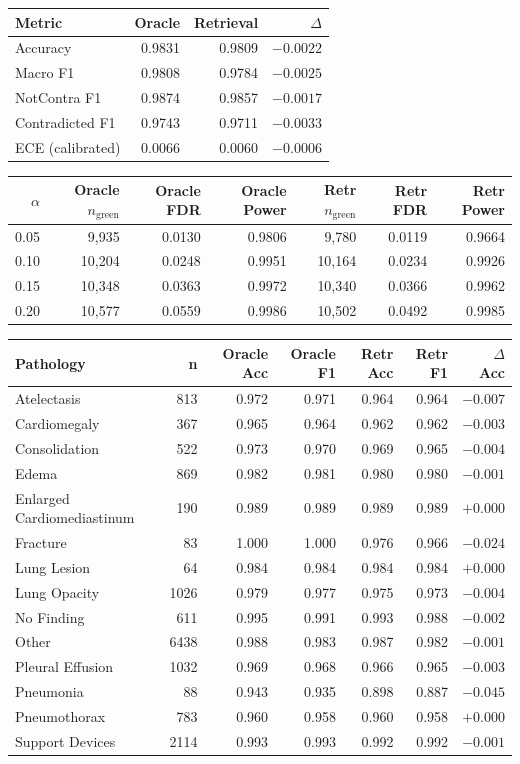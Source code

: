 \begin{tabular}{lrrr}
\toprule
Metric & Oracle & Retrieval & $\Delta$ \\
\midrule
Accuracy & 0.9831 & 0.9809 & $-0.0022$ \\
Macro F1 & 0.9808 & 0.9784 & $-0.0025$ \\
NotContra F1 & 0.9874 & 0.9857 & $-0.0017$ \\
Contradicted F1 & 0.9743 & 0.9711 & $-0.0033$ \\
ECE (calibrated) & 0.0066 & 0.0060 & $-0.0006$ \\
\bottomrule
\end{tabular}

\begin{tabular}{rrrrrrr}
\toprule
$\alpha$ & Oracle $n_\text{green}$ & Oracle FDR & Oracle Power & Retr $n_\text{green}$ & Retr FDR & Retr Power \\
\midrule
0.05 & 9,935 & 0.0130 & 0.9806 & 9,780 & 0.0119 & 0.9664 \\
0.10 & 10,204 & 0.0248 & 0.9951 & 10,164 & 0.0234 & 0.9926 \\
0.15 & 10,348 & 0.0363 & 0.9972 & 10,340 & 0.0366 & 0.9962 \\
0.20 & 10,577 & 0.0559 & 0.9986 & 10,502 & 0.0492 & 0.9985 \\
\bottomrule
\end{tabular}

\begin{tabular}{lrrrrrr}
\toprule
Pathology & n & Oracle Acc & Oracle F1 & Retr Acc & Retr F1 & $\Delta$ Acc \\
\midrule
Atelectasis & 813 & 0.972 & 0.971 & 0.964 & 0.964 & $-0.007$ \\
Cardiomegaly & 367 & 0.965 & 0.964 & 0.962 & 0.962 & $-0.003$ \\
Consolidation & 522 & 0.973 & 0.970 & 0.969 & 0.965 & $-0.004$ \\
Edema & 869 & 0.982 & 0.981 & 0.980 & 0.980 & $-0.001$ \\
Enlarged Cardiomediastinum & 190 & 0.989 & 0.989 & 0.989 & 0.989 & $+0.000$ \\
Fracture & 83 & 1.000 & 1.000 & 0.976 & 0.966 & $-0.024$ \\
Lung Lesion & 64 & 0.984 & 0.984 & 0.984 & 0.984 & $+0.000$ \\
Lung Opacity & 1026 & 0.979 & 0.977 & 0.975 & 0.973 & $-0.004$ \\
No Finding & 611 & 0.995 & 0.991 & 0.993 & 0.988 & $-0.002$ \\
Other & 6438 & 0.988 & 0.983 & 0.987 & 0.982 & $-0.001$ \\
Pleural Effusion & 1032 & 0.969 & 0.968 & 0.966 & 0.965 & $-0.003$ \\
Pneumonia & 88 & 0.943 & 0.935 & 0.898 & 0.887 & $-0.045$ \\
Pneumothorax & 783 & 0.960 & 0.958 & 0.960 & 0.958 & $+0.000$ \\
Support Devices & 2114 & 0.993 & 0.993 & 0.992 & 0.992 & $-0.001$ \\
\bottomrule
\end{tabular}

